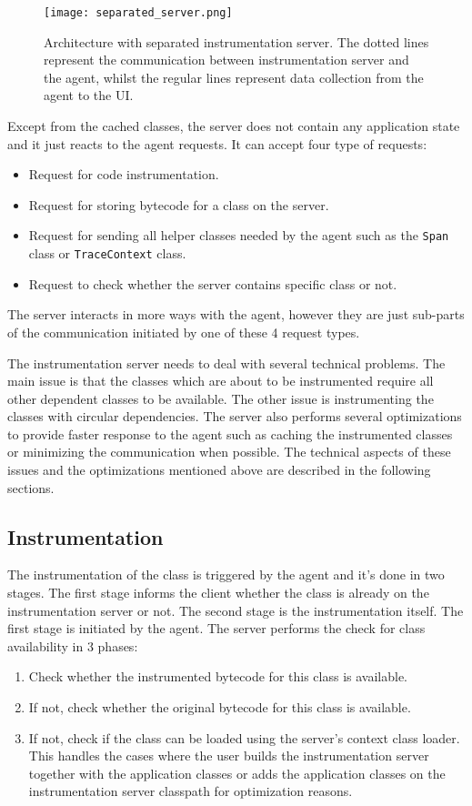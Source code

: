  \begin{figure}
 	\centering
 	\texttt{[image: separated\_server.png]}
 	\caption{Architecture with separated instrumentation server. The dotted lines represent the communication between instrumentation server and the agent, whilst the regular lines represent data collection from the agent to the UI.}
 	\label{fig:separated_server}
 \end{figure}

Except from the cached classes, the server does not contain any application state and it just reacts to the agent requests. It can accept four type of requests:
\begin{itemize}
	\item Request for code instrumentation.
	\item Request for storing bytecode for a class on the server.
	\item Request for sending all helper classes needed by the agent such as the \texttt{Span} class or \texttt{TraceContext} class.
	\item Request to check whether the server contains specific class or not.
\end{itemize}
The server interacts in more ways with the agent, however they are just sub-parts of the communication initiated by one of these 4 request types.	

The instrumentation server needs to deal with several technical problems. The main issue is that the classes which are about to be instrumented require all other dependent classes to be available. The other issue is instrumenting the classes with circular dependencies. The server also performs several optimizations to provide faster response to the agent such as caching the instrumented classes or minimizing the communication when possible. The technical aspects of these issues and the optimizations mentioned above are described in the following sections.
\subsection{Instrumentation}
The instrumentation of the class is triggered by the agent and it's done in two stages. The first stage informs the client whether the class is already on the instrumentation server or not. The second stage is the instrumentation itself. The first stage is initiated by the agent. The server performs the check for class availability in 3 phases:
\begin{enumerate}
	\item Check whether the instrumented bytecode for this class is available.
	\item If not, check whether the original bytecode for this class is available.
	\item If not, check if the class can be loaded using the server's context class loader. This handles the cases where the user builds the instrumentation server together with the application classes or adds the application classes on the instrumentation server classpath for optimization reasons.
\end{enumerate}

